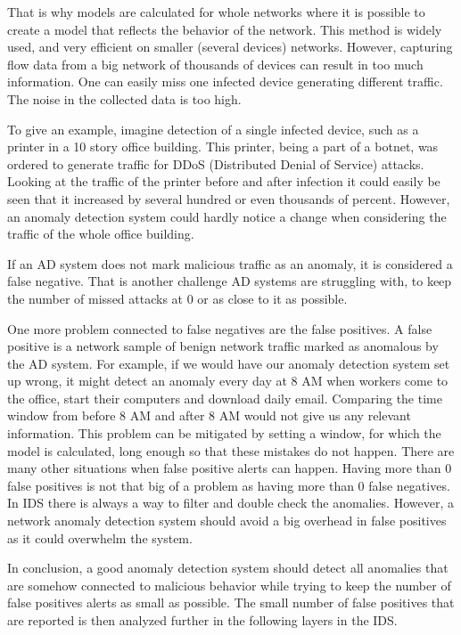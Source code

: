 \documentclass[thesis=B,english]{FITthesis}[2012/10/20]
\begin{document}
That is why models are calculated for whole networks where it is possible to create a model that reflects the behavior of the network.
This method is widely used, and very efficient on smaller (several devices) networks.
However, capturing flow data from a big network of thousands of devices can result in too much information.
One can easily miss one infected device generating different traffic.
The noise in the collected data is too high.

To give an example, imagine detection of a single infected device, such as a printer in a 10 story office building.
This printer, being a part of a botnet, was ordered to generate traffic for DDoS (Distributed Denial of Service) attacks.
Looking at the traffic of the printer before and after infection it could easily be seen that it increased by several hundred or even thousands of percent.
However, an anomaly detection system could hardly notice a change when considering the traffic of the whole office building.

If an AD system does not mark malicious traffic as an anomaly, it is considered a false negative.
That is another challenge AD systems are struggling with, to keep the number of missed attacks at 0 or as close to it as possible.

One more problem connected to false negatives are the false positives.
A false positive is a network sample of benign network traffic marked as anomalous by the AD system.
For example, if we would have our anomaly detection system set up wrong, it might detect an anomaly every day at 8 AM when workers come to the office, start their computers and download daily email.
Comparing the time window from before 8 AM and after 8 AM would not give us any relevant information.
This problem can be mitigated by setting a window, for which the model is calculated, long enough so that these mistakes do not happen.
There are many other situations when false positive alerts can happen.
Having more than 0 false positives is not that big of a problem as having more than 0 false negatives.
In IDS there is always a way to filter and double check the anomalies.
However,  a network anomaly detection system should avoid a big overhead in false positives as it could overwhelm the system.

In conclusion, a good anomaly detection system should detect all anomalies that are somehow connected to malicious behavior while trying to keep the number of false positives alerts as small as possible.
The small number of false positives that are reported is then analyzed further in the following layers in the IDS.
\end{document}
